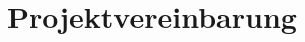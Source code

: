 \documentclass{fhnwreport/fhnwreport}
\begin{document}
%


\clearpage
{}
{}
{}

\clearpage
\section*{Projektvereinbarung}
\label{sec:projektvereinbarung}

\end{document}
